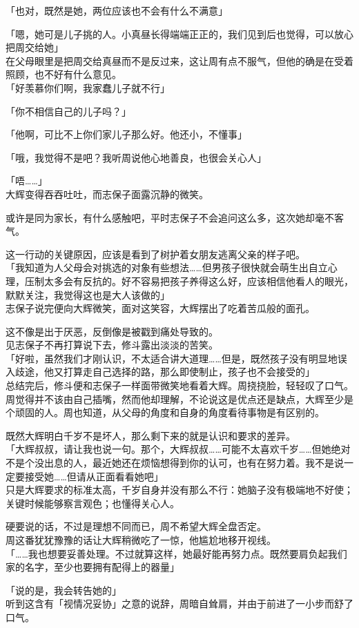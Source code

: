 「也对，既然是她，两位应该也不会有什么不满意」

「嗯，她可是儿子挑的人。小真昼长得端端正正的，我们见到后也觉得，可以放心把周交给她」\\

在父母眼里是把周交给真昼而不是反过来，这让周有点不服气，但他的确是在受着照顾，也不好有什么意见。\\

「好羡慕你们啊，我家蠢儿子就不行」

「你不相信自己的儿子吗？」

「他啊，可比不上你们家儿子那么好。他还小，不懂事」

「哦，我觉得不是吧？我听周说他心地善良，也很会关心人」

「唔……」\\

大辉变得吞吞吐吐，而志保子面露沉静的微笑。

或许是同为家长，有什么感触吧，平时志保子不会追问这么多，这次她却毫不客气。

这一行动的关键原因，应该是看到了树护着女朋友逃离父亲的样子吧。\\

「我知道为人父母会对挑选的对象有些想法……但男孩子很快就会萌生出自立心理，压制太多会有反抗的。好不容易把孩子养得这么好，应该相信他看人的眼光，默默关注，我觉得这也是大人该做的」\\

志保子说完便向大辉微笑，面对这笑容，大辉摆出了吃着苦瓜般的面孔。

这不像是出于厌恶，反倒像是被戳到痛处导致的。\\

见志保子不再打算说下去，修斗露出淡淡的苦笑。\\

「好啦，虽然我们才刚认识，不太适合讲大道理……但是，既然孩子没有明显地误入歧途，他又打算走自己选择的路，那么即使制止，孩子也不会接受的」\\

总结完后，修斗便和志保子一样面带微笑地看着大辉。周挠挠脸，轻轻叹了口气。\\

周觉得并不该由自己插嘴，然而他却理解，不论说这是优点还是缺点，大辉至少是个顽固的人。周也知道，从父母的角度和自身的角度看待事物是有区别的。

既然大辉明白千岁不是坏人，那么剩下来的就是认识和要求的差异。\\

「大辉叔叔，请让我也说一句。那个，大辉叔叔……可能不太喜欢千岁……但她绝对不是个没出息的人，最近她还在烦恼想得到你的认可，也有在努力着。我不是说一定要接受她……但请从正面看看她吧」\\

只是大辉要求的标准太高，千岁自身并没有那么不行：她脑子没有极端地不好使；关键时候能够察言观色；也懂得关心人。

硬要说的话，不过是理想不同而已，周不希望大辉全盘否定。\\

周这番犹犹豫豫的话让大辉稍微吃了一惊，他尴尬地移开视线。\\

「……我也想要妥善处理。不过就算这样，她最好能再努力点。既然要肩负起我们家的名字，至少也要拥有配得上的器量」

「说的是，我会转告她的」\\

听到这含有「视情况妥协」之意的说辞，周暗自耸肩，并由于前进了一小步而舒了口气。
